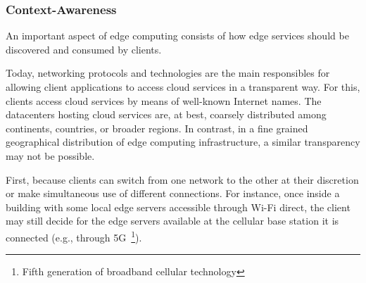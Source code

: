 \subsubsection{Context-Awareness}

An important aspect of edge computing consists of how edge services should be discovered and consumed by clients. 

Today, networking protocols and technologies are the main responsibles for allowing client applications to access cloud services in a transparent way. For this, clients access cloud services by means of well-known Internet names. The datacenters hosting cloud services are, at best, coarsely distributed among continents, countries, or broader regions. 
In contrast, in a fine grained geographical distribution of edge computing infrastructure, a similar transparency may not be possible. 

%
%
%

First, because clients can switch from one network to the other at their discretion or make simultaneous use of different connections. For instance, once inside a building with some local edge servers accessible through Wi-Fi direct, the client may still decide for the edge servers available at the cellular base station it is connected (e.g., through 5G~\footnote{Fifth generation of broadband cellular technology}). 

